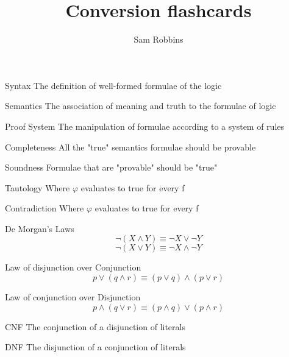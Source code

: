 \documentclass[grid,avery5371]{flashcards}
\title{Conversion flashcards}
\author{Sam Robbins}
\begin{document}
\begin{flashcard}[]{Syntax}
The definition of well-formed formulae of the logic
\end{flashcard}

\begin{flashcard}[]{Semantics}
	The association of meaning and truth to the formulae of logic
\end{flashcard}

\begin{flashcard}[]{Proof System}
	The manipulation of formulae according to a system of rules
\end{flashcard}

\begin{flashcard}[]{Completeness}
	All the "true" semantics formulae should be provable
\end{flashcard}

\begin{flashcard}[]{Soundness}
	Formulae that are "provable" should be "true"
\end{flashcard}

\begin{flashcard}[]{Tautology}
	Where $\varphi$ evaluates to true for every f
\end{flashcard}

\begin{flashcard}[]{Contradiction}
	Where $\varphi$ evaluates to true for every f
\end{flashcard}

\begin{flashcard}[]{De Morgan's Laws}
	$$\lnot(X\land Y)\equiv \lnot X \lor \lnot Y$$
	$$\lnot(X\lor Y)\equiv \lnot X \land \lnot Y$$
\end{flashcard}

\begin{flashcard}[]{Law of disjunction over Conjunction}
	\[
	p \vee(q \wedge r) \equiv(p \vee q) \wedge(p \vee r)
	\]
\end{flashcard}

\begin{flashcard}[]{Law of conjunction over Disjunction}
	\[
	p \wedge(q \vee r) \equiv(p \wedge q) \vee(p \wedge r)
	\]
\end{flashcard}

\begin{flashcard}[]{CNF}
	The conjunction of a disjunction of literals
\end{flashcard}

\begin{flashcard}[]{DNF}
	The disjunction of a conjunction of literals
\end{flashcard}
\end{document}
